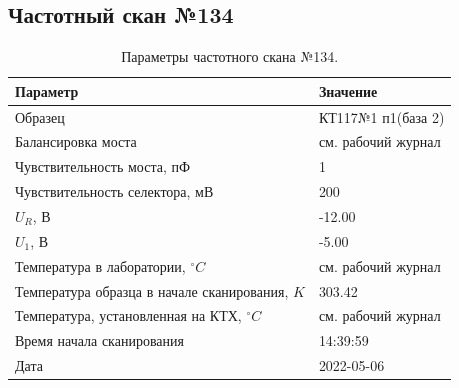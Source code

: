 \subsection{Частотный скан №134}
\begin{table}[!ht]
    \centering
    \caption{Параметры частотного скана №134.}
    \begin{tabular}{|l|l|}
        \hline
        Параметр                                       & Значение                  \\ \hline
        Образец                                        & КТ117№1 п1(база 2)        \\ \hline
        Балансировка моста                             & см. рабочий журнал        \\ \hline
        Чувствительность моста, пФ                     & 1                         \\ \hline
        Чувствительность селектора, мВ                 & 200                       \\ \hline
        $U_R$, В                                       & -12.00                    \\ \hline
        $U_1$, В                                       & -5.00                     \\ \hline
        Температура в лаборатории, $^\circ C$          & см. рабочий журнал        \\ \hline
        Температура образца в начале сканирования, $K$ & 303.42                    \\ \hline
        Температура, установленная на КТХ, $^\circ C$  & см. рабочий журнал        \\ \hline
        Время начала сканирования                      & 14:39:59                  \\ \hline
        Дата                                           & 2022-05-06                \\ \hline
    \end{tabular}
    \label{table:frequency_scan_134}
\end{table}

